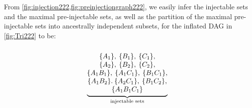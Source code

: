 From \cref{fig:injection222,fig:preinjectiongraph222}, we easily infer the injectable sets and the maximal pre-injectable sets, as well as the partition of the maximal pre-injectable sets into ancestrally independent subsets, for the inflated DAG in \cref{fig:Tri222} to be:
\begin{align}\label{eq:basicsetup222}
{\underbrace{\begin{matrix}
\, \\
\brackets{A_1},\:\brackets{B_1},\:\brackets{C_1},\\
\brackets{A_2},\:\brackets{B_2},\:\brackets{C_2},\\
\brackets{A_1 B_1},\:\brackets{A_1 C_1},\:\brackets{B_1 C_1},\\
\brackets{A_1 B_2}.\:\brackets{A_2 C_1},\:\brackets{B_1 C_2},\\
\brackets{A_1 B_1 C_1}
\end{matrix}}_{\substack{\text{injectable sets}}}}

\end{align}
